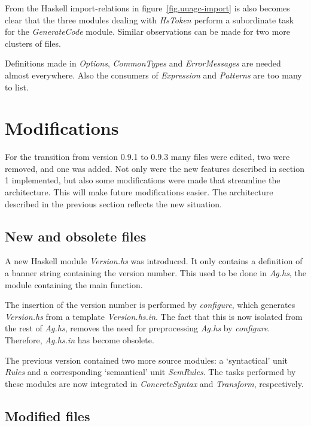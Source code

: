 \documentclass[twoside]{article}
\begin{document}
From the Haskell import-relations in figure~\ref{fig.uuagc-import} is also becomes clear
that the three modules dealing with {\em HsToken} perform a subordinate task for
the {\em GenerateCode} module.
Similar observations can be made for two more clusters of files.

Definitions made in {\em Options}, {\em CommonTypes} and {\em ErrorMessages}
are needed almost everywhere. Also the consumers of {\em Expression} and {\em Patterns}
are too many to list.


\newpage
\section{Modifications}

For the transition from version 0.9.1 to 0.9.3
many files were edited, two were removed, and one was added.
Not only were the new features described in section 1 implemented,
but also some modifications were made that streamline the architecture.
This will make future modifications easier.
The architecture described in the previous section reflects the new situation.

\subsection{New and obsolete files}

A new Haskell module {\em Version.hs} was introduced.
It only contains a definition of a banner string containing the version number.
This used to be done in {\em Ag.hs}, the module containing the main function.

The insertion of the version number is performed by {\em configure},
which generates {\em Version.hs} from a template {\em Version.hs.in}.
The fact that this is now isolated from the rest of {\em Ag.hs},
removes the need for preprocessing {\em Ag.hs} by {\em configure}.
Therefore, {\em Ag.hs.in} has become obsolete.

The previous version contained two more source modules:
a `syntactical' unit {\em Rules} and a corresponding `semantical' unit {\em SemRules}.
The tasks performed by these modules are now integrated in
{\em ConcreteSyntax} and {\em Transform}, respectively.


\subsection{Modified files}
\end{document}
